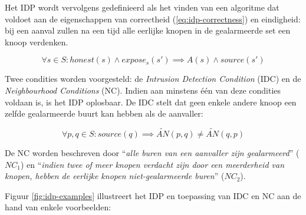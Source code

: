 Het IDP wordt vervolgens gedefinieerd als het vinden van een algoritme dat
voldoet aan de eigenschappen van correctheid (\ref{eq:idp-correctness}) en
eindigheid: bij een aanval zullen na een tijd alle eerlijke knopen in de
gealarmeerde set een knoop verdenken.

\begin{equation} \label{eq:idp-correctness}
\forall s \in S : honest(s) \wedge expose_s(s') \implies A(s) \wedge source(s')
\end{equation}

Twee condities worden voorgesteld: de \emph{Intrusion Detection Condition}
(IDC) en de \emph{Neighbourhood Conditions} (NC). Indien aan minstens \'e\'en
van deze condities voldaan is, is het IDP oplosbaar. De IDC stelt dat geen
enkele andere knoop een zelfde gealarmeerde buurt kan hebben als de aanvaller:

\begin{equation} \label{eq:idc}
\forall p,q \in S : source(q) \implies \tilde{AN}(p,q) \not= \tilde{AN}(q,p)
\end{equation}

De NC worden beschreven door ``\emph{alle buren van een aanvaller zijn
gealarmeerd}'' ($NC_1$) en ``\emph{indien twee of meer knopen verdacht zijn door
een meerderheid van knopen, hebben de eerlijke knopen niet-gealarmeerde buren}''
($NC_2$).

Figuur \ref{fig:idp-examples} illustreert het IDP en toepassing van IDC en NC
aan de hand van enkele voorbeelden:


